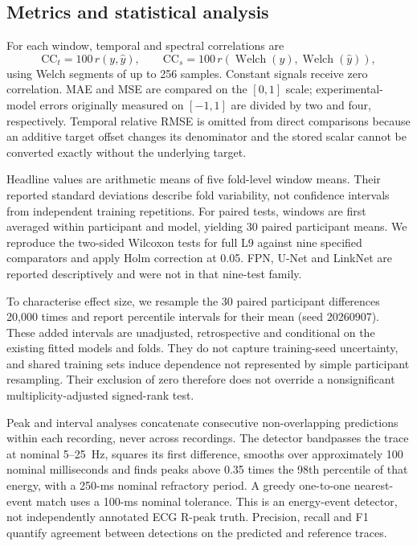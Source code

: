 \documentclass[11pt,a4paper]{article}
\newcommand{\cct}{\mathrm{CC}_{t}}
\newcommand{\ccs}{\mathrm{CC}_{s}}
\begin{document}
\subsection{Metrics and statistical analysis}

For each window, temporal and spectral correlations are
\begin{equation}
\cct=100\,r(y,\hat y),\qquad
\ccs=100\,r(\operatorname{Welch}(y),\operatorname{Welch}(\hat y)),
\end{equation}
using Welch segments of up to 256 samples. Constant signals receive zero correlation.
MAE and MSE are compared on the $[0,1]$ scale; experimental-model errors originally measured
on $[-1,1]$ are divided by two and four, respectively. Temporal relative RMSE is omitted
from direct comparisons because an additive target offset changes its denominator and the
stored scalar cannot be converted exactly without the underlying target.

Headline values are arithmetic means of five fold-level window means. Their reported
standard deviations describe fold variability, not confidence intervals from independent
training repetitions. For paired tests, windows are first averaged within participant and
model, yielding 30 paired participant means. We reproduce the two-sided Wilcoxon tests
for full L9 against nine specified comparators and apply Holm correction at 0.05.
FPN, U-Net and LinkNet are reported descriptively and were not in that nine-test family.

To characterise effect size, we resample the 30 paired participant differences 20,000 times
and report percentile intervals for their mean (seed 20260907). These added intervals are
unadjusted, retrospective and conditional on the existing fitted models and folds. They
do not capture training-seed uncertainty, and shared training sets induce dependence not
represented by simple participant resampling. Their exclusion of zero therefore does not
override a nonsignificant multiplicity-adjusted signed-rank test.

Peak and interval analyses concatenate consecutive non-overlapping predictions within each
recording, never across recordings. The detector bandpasses the trace at nominal 5--25~Hz,
squares its first difference, smooths over approximately 100 nominal milliseconds and
finds peaks above 0.35 times the 98th percentile of that energy, with a 250-ms nominal
refractory period. A greedy one-to-one nearest-event match uses a 100-ms nominal tolerance.
This is an energy-event detector, not independently annotated ECG R-peak truth. Precision,
recall and F1 quantify agreement between detections on the predicted and reference traces.
\end{document}
